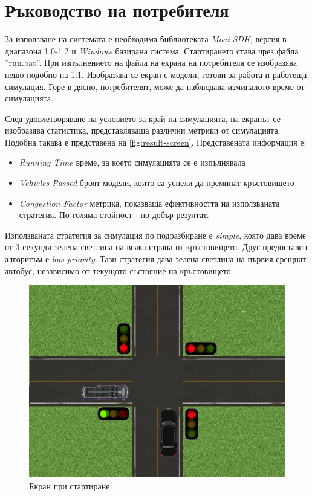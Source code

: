 \chapter{Ръководство на потребителя}
	За използване на системата е необходима библиотеката \emph{Moai SDK},
	версия в диапазона 1.0-1.2 и \emph{Windows} базирана система. Стартирането
	става чрез файла ''run.bat''. При изпълнението на файла на екрана на потребителя
	се изобразява нещо подобно на \ref{fig:simulation-screen}. Изобразява се
	екран с модели, готови за работа и работеща симулация. Горе в дясно, потребителят,
	може да наблюдава изминалото време от симулацията.
	
	След удовлетворяване на условието за край на симулацията, на екранът се изобразява
	статистика, представляваща различни метрики от симулацията. Подобна такава е представена
	на \ref{fig:result-screen}. Представената информация е:
	
	\begin{itemize}
		\item \emph{Running Time} време, за което симулацията се е изпълнявала
		\item \emph{Vehicles Passed} броят модели, които са успели да преминат кръстовището
		\item \emph{Congestion Factor} метрика, показваща ефективността на използваната стратегия. 
			По-голяма стойност - по-добър резултат.
	\end{itemize}
	
	Използваната стратегия за симулация по подразбиране е \emph{simple}, която дава
	време от 3 секунди зелена светлина на всяка страна от кръстовището. Друг предоставен
	алгоритъм е \emph{bus-priority}. Тази стратегия дава зелена светлина на първия срещнат автобус,
	независимо от текущото състояние на кръстовището.
	
	\begin{figure}[htb]
		\centering
		\includegraphics[scale=0.4]{assets/simulation.jpg}
		\caption{Екран при стартиране}
		\label{fig:simulation-screen}
	\end{figure}
	

